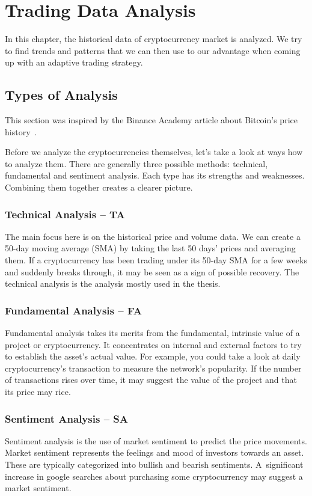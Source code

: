 \chapter{Trading Data Analysis}
\label{chapter-data-analysis}

In this chapter, the historical data of cryptocurrency market is analyzed. We try to find trends and patterns that we can then use to our advantage when coming up with an adaptive trading strategy.

\section{Types of Analysis}
This section was inspired by the Binance Academy article about Bitcoin's price history~\cite{binance:bitcoin-price-history}.

Before we analyze the cryptocurrencies themselves, let's take a look at ways how to analyze them. There are generally three possible methods: technical, fundamental and sentiment analysis. Each type has its strengths and weaknesses. Combining them together creates a clearer picture.

\subsection*{Technical Analysis -- TA}
The main focus here is on the historical price and volume data. We can create a 50-day moving average (SMA) by taking the last 50 days' prices and averaging them. If a cryptocurrency has been trading under its 50-day SMA for a few weeks and suddenly breaks through, it may be seen as a sign of possible recovery. The technical analysis is the analysis mostly used in the thesis.

\subsection*{Fundamental Analysis -- FA}
Fundamental analysis takes its merits from the fundamental, intrinsic value of a project or cryptocurrency. It concentrates on internal and external factors to try to establish the asset's actual value. For example, you could take a look at daily cryptocurrency's transaction to measure the network's popularity. If the number of transactions rises over time, it may suggest the value of the project and that its price may rice.

\subsection*{Sentiment Analysis -- SA}
Sentiment analysis is the use of market sentiment to predict the price movements. Market sentiment represents the feelings and mood of investors towards an asset. These are typically categorized into bullish and bearish sentiments. A~significant increase in google searches about purchasing some cryptocurrency may suggest a market sentiment.

